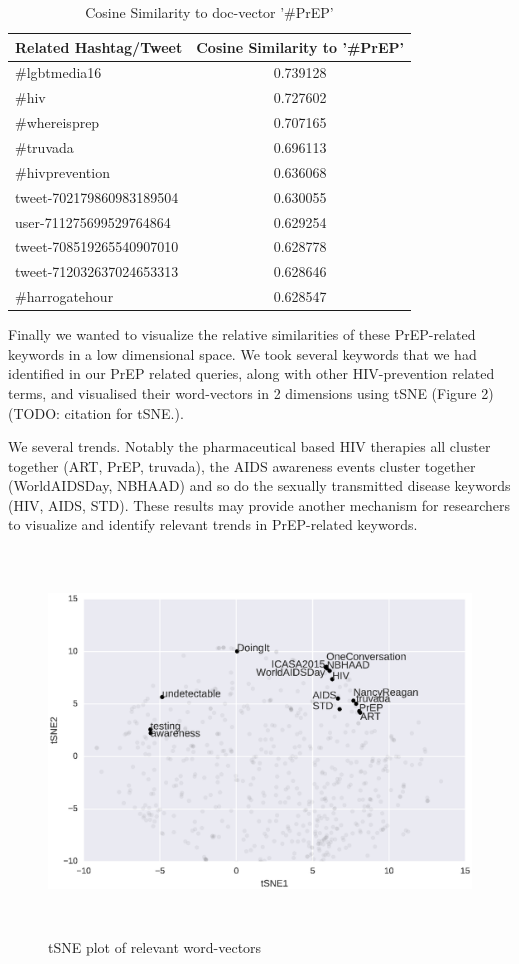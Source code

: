 \documentclass{sig-alternate-05-2015}
\begin{document}
\begin{table}
\centering
\caption{Cosine Similarity to doc-vector '\#PrEP'}
\begin{tabular}{|l|c|} \hline
Related Hashtag/Tweet & Cosine Similarity to '\#PrEP'\\ \hline
\#lgbtmedia16 & 0.739128\\ \hline
\#hiv & 	0.727602 \\ \hline
\#whereisprep & 0.707165 \\ \hline
\#truvada & 0.696113 \\ \hline
\#hivprevention & 0.636068 \\ \hline
tweet-702179860983189504 & 0.630055\\ \hline
user-711275699529764864 & 0.629254\\ \hline
tweet-708519265540907010 & 0.628778 \\ \hline
tweet-712032637024653313 & 0.628646 \\ \hline
\#harrogatehour & 0.628547 \\ \hline
\hline\end{tabular}
\end{table}

Finally we wanted to visualize the relative similarities of these PrEP-related keywords in a low dimensional space. We took several keywords that we had identified in our PrEP related queries, along with other HIV-prevention related terms, and visualised their word-vectors in 2 dimensions using tSNE (Figure 2)(TODO: citation for tSNE.).

We several trends. Notably the pharmaceutical based HIV therapies all cluster together (ART, PrEP, truvada), the AIDS awareness events cluster together (WorldAIDSDay, NBHAAD) and so do the sexually transmitted disease keywords (HIV, AIDS, STD). These results may provide another mechanism for researchers to visualize and identify relevant trends in PrEP-related keywords.

\begin{figure}
\centering
\includegraphics[height=4in, width=6in]{tSNE_word}
\caption{tSNE plot of relevant word-vectors}
\end{figure}
\end{document}
